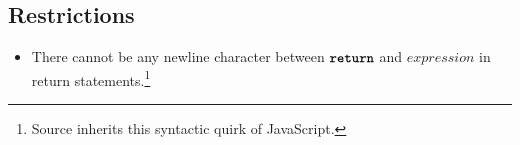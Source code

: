 \subsection*{Restrictions}

\begin{itemize}
\item There cannot be any newline character between
  $\textbf{\texttt{return}}$ and $\textit{expression}$ in return statements.\footnote{
  Source inherits this syntactic quirk of JavaScript.}
\end{itemize}
